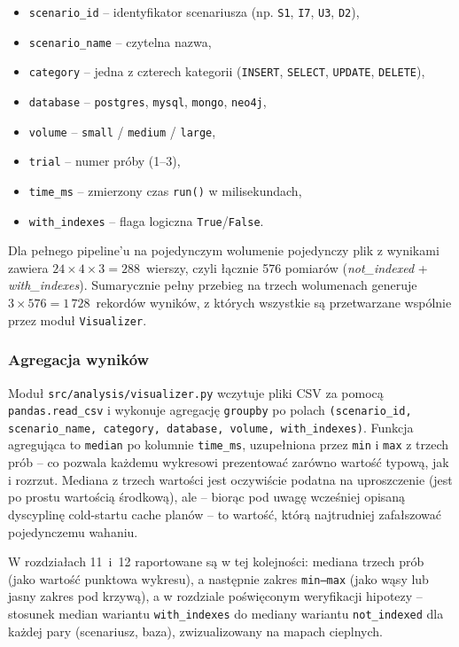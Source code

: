 \begin{itemize}
    \item \texttt{scenario\_id} -- identyfikator scenariusza
    (np. \texttt{S1}, \texttt{I7}, \texttt{U3}, \texttt{D2}),
    \item \texttt{scenario\_name} -- czytelna nazwa,
    \item \texttt{category} -- jedna z czterech kategorii
    (\texttt{INSERT}, \texttt{SELECT}, \texttt{UPDATE},
    \texttt{DELETE}),
    \item \texttt{database} -- \texttt{postgres},
    \texttt{mysql}, \texttt{mongo}, \texttt{neo4j},
    \item \texttt{volume} -- \texttt{small} / \texttt{medium}
    / \texttt{large},
    \item \texttt{trial} -- numer próby (1--3),
    \item \texttt{time\_ms} -- zmierzony czas
    \texttt{run()} w milisekundach,
    \item \texttt{with\_indexes} -- flaga logiczna
    \texttt{True}/\texttt{False}.
\end{itemize}

\noindent Dla pełnego pipeline'u na pojedynczym wolumenie pojedynczy
plik z wynikami zawiera $24 \times 4 \times 3 = 288$~wierszy, czyli łącznie
576 pomiarów (\emph{not\_indexed} + \emph{with\_indexes}).
Sumarycznie pełny przebieg na trzech wolumenach generuje
$3 \times 576 = 1\,728$~rekordów wyników, z których wszystkie są
przetwarzane wspólnie przez moduł \texttt{Visualizer}.

\subsubsection*{Agregacja wyników}

Moduł \texttt{src/analysis/visualizer.py} wczytuje pliki CSV za
pomocą \texttt{pandas.read\_csv} i wykonuje agregację
\texttt{groupby} po polach \texttt{(scenario\_id, scenario\_name,
category, database, volume, with\_indexes)}. Funkcja agregująca to
\texttt{median} po kolumnie \texttt{time\_ms}, uzupełniona przez
\texttt{min} i \texttt{max} z trzech prób -- co pozwala każdemu
wykresowi prezentować zarówno wartość typową, jak i rozrzut.
Mediana z trzech wartości jest oczywiście podatna na uproszczenie
(jest po prostu wartością środkową), ale -- biorąc pod uwagę
wcześniej opisaną dyscyplinę cold-startu cache planów -- to
wartość, którą najtrudniej zafałszować pojedynczemu wahaniu.

W rozdziałach 11~i~12 raportowane są w tej kolejności: mediana
trzech prób (jako wartość punktowa wykresu), a następnie zakres
\texttt{min--max} (jako wąsy lub jasny zakres pod krzywą),
a w rozdziale poświęconym weryfikacji hipotezy -- stosunek
median wariantu \texttt{with\_indexes} do mediany wariantu
\texttt{not\_indexed} dla każdej pary (scenariusz, baza), zwizualizowany
na mapach cieplnych.
